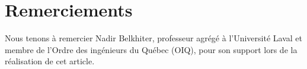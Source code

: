 \section*{Remerciements}
Nous tenons à remercier Nadir Belkhiter, professeur agrégé à l'Université Laval et membre de l'Ordre des ingénieurs du Québec (OIQ), pour son support lors de la réalisation de cet article. 
